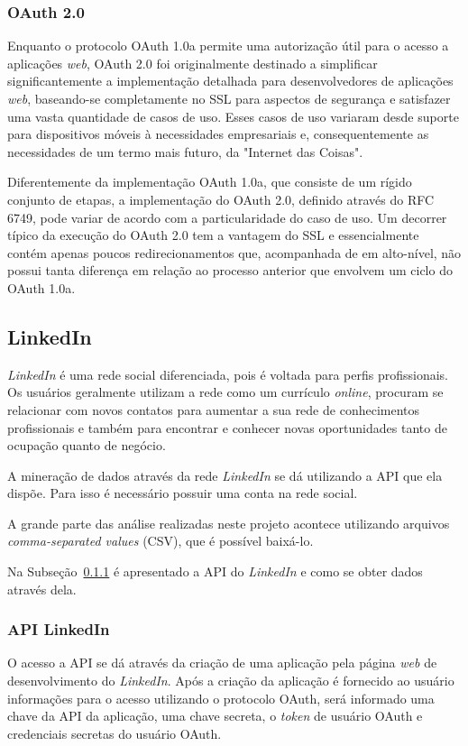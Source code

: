 \subsubsection{\textbf{OAuth 2.0}}
Enquanto o protocolo OAuth 1.0a permite uma autorização útil para o acesso a aplicações \textit{web}, OAuth 2.0 foi originalmente destinado a simplificar significantemente a implementação detalhada para desenvolvedores de aplicações \textit{web}, baseando-se completamente no SSL para aspectos de segurança e satisfazer uma vasta quantidade de casos de uso. Esses casos de uso variaram desde suporte para dispositivos móveis à necessidades empresariais e, consequentemente as necessidades de um termo mais futuro, da "Internet das Coisas"\space \cite{mining-social-web}.

Diferentemente da implementação OAuth 1.0a, que consiste de um rígido conjunto de etapas, a implementação do OAuth 2.0, definido através do RFC 6749, pode variar de acordo com a particularidade do caso de uso. Um decorrer típico da execução do OAuth 2.0 tem a vantagem do SSL e essencialmente contém apenas poucos redirecionamentos que, acompanhada de em alto-nível, não possui tanta diferença em relação ao processo anterior que envolvem um ciclo do OAuth 1.0a.

\subsection{LinkedIn}
\textit{LinkedIn} é uma rede social diferenciada, pois é voltada para perfis profissionais. Os usuários geralmente utilizam a rede como um currículo \textit{online}, procuram se relacionar com novos contatos para aumentar a sua rede de conhecimentos profissionais e também para encontrar e conhecer novas oportunidades tanto de ocupação quanto de negócio.

A mineração de dados através da rede \textit{LinkedIn} se dá utilizando a API que ela dispõe. Para isso é necessário possuir uma conta na rede social.

A grande parte das análise realizadas neste projeto acontece utilizando arquivos \textit{comma-separated values} (CSV), que é possível baixá-lo.

Na Subseção~\ref{api-linkedin} é apresentado a API do \textit{LinkedIn} e como se obter dados através dela.

\subsubsection{\textbf{API LinkedIn}}\label{api-linkedin}
O acesso a API se dá através da criação de uma aplicação pela página \textit{web} de desenvolvimento do \textit{LinkedIn}. Após a criação da aplicação é fornecido ao usuário informações para o acesso utilizando o protocolo OAuth, será informado uma chave da API da aplicação, uma chave secreta, o \textit{token} de usuário OAuth e credenciais secretas do usuário OAuth.

